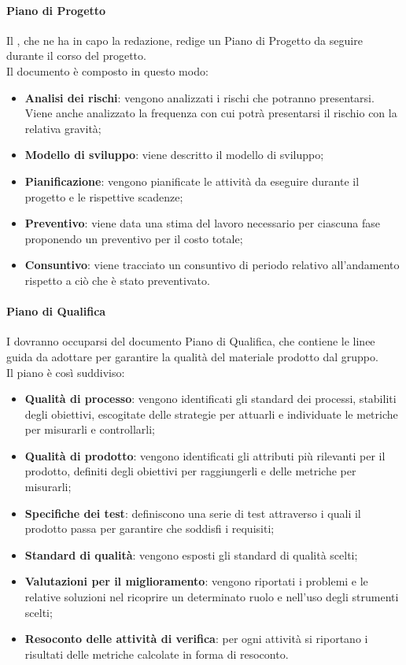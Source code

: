 			\paragraph{Piano di Progetto}
			Il , che ne ha in capo la redazione, redige un Piano di Progetto da seguire durante	il corso del progetto.
			\\
			Il documento è composto in questo modo: 
			\begin{itemize}
				\item \textbf{Analisi dei rischi}: vengono analizzati i rischi che potranno presentarsi. Viene anche analizzato la frequenza con cui potrà presentarsi il rischio con la relativa gravità;
				\item \textbf{Modello di sviluppo}: viene descritto il modello di sviluppo;
				\item \textbf{Pianificazione}: vengono pianificate le attività da eseguire durante il progetto e le rispettive scadenze;
				\item \textbf{Preventivo}: viene data una stima del lavoro necessario per ciascuna fase proponendo un preventivo per il costo totale;
				\item \textbf{Consuntivo}: viene tracciato un consuntivo di periodo relativo all'andamento rispetto a ciò che è stato preventivato.
			\end{itemize}
			\paragraph{Piano di Qualifica}
			I  dovranno occuparsi del documento Piano di Qualifica, che contiene le linee guida da adottare per garantire la qualità del materiale prodotto dal gruppo.
			\\
			Il piano è così suddiviso:			 
			\begin{itemize}
				\item \textbf{Qualità di processo}: vengono identificati gli standard dei processi, stabiliti degli obiettivi, escogitate delle strategie per attuarli e individuate le metriche per misurarli e controllarli;
				\item \textbf{Qualità di prodotto}: vengono identificati gli attributi più rilevanti per il prodotto, definiti degli obiettivi per raggiungerli e delle metriche per misurarli;
				\item \textbf{Specifiche dei test}: definiscono una serie di test attraverso i quali il prodotto passa per garantire che soddisfi i requisiti;
				\item \textbf{Standard di qualità}: vengono esposti gli standard di qualità scelti;
				\item \textbf{Valutazioni per il miglioramento}: vengono riportati i problemi e le relative soluzioni nel ricoprire un determinato ruolo e nell'uso degli strumenti scelti;
				\item \textbf{Resoconto delle attività di verifica}: per ogni attività si riportano i risultati delle metriche calcolate in forma di resoconto.
			\end{itemize}
